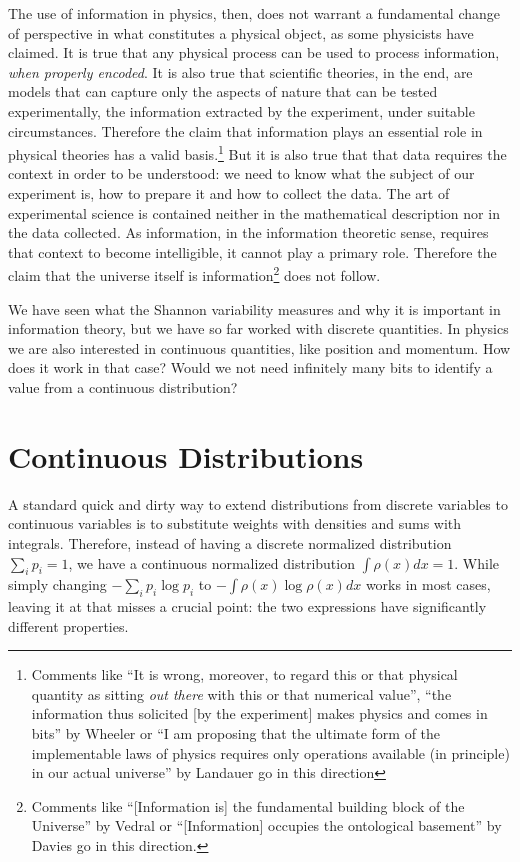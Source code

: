 \documentclass[iopart]{revtex4-1}
\begin{document}
The use of information in physics, then, does not warrant a fundamental change of perspective in what constitutes a physical object, as some physicists have claimed. It is true that any physical process can be used to process information, \emph{when properly encoded}. It is also true that scientific theories, in the end, are models that can capture only the aspects of nature that can be tested experimentally, the information extracted by the experiment, under suitable circumstances. Therefore the claim that information plays an essential role in physical theories has a valid basis.\footnote{Comments like ``It is wrong, moreover, to regard this or that  physical quantity as sitting \emph{out there} with this or that numerical value'', ``the information thus solicited [by the experiment] makes physics and comes in bits'' by Wheeler\cite{Wheeler} or ``I am proposing that the ultimate form of the implementable laws of physics requires only operations available (in principle) in our actual universe'' by Landauer\cite{Landauer} go in this direction} But it is also true that that data requires the context in order to be understood: we need to know what the subject of our experiment is, how to prepare it and how to collect the data. The art of experimental science is contained neither in the mathematical description nor in the data collected. As information, in the information theoretic sense, requires that context to become intelligible, it cannot play a primary role. Therefore the claim that the universe itself is information\footnote{Comments like ``[Information is] the fundamental building block of the Universe'' by Vedral\cite{Vedral} or ``[Information] occupies the ontological basement'' by Davies\cite{Davies} go in this direction.} does not follow.

We have seen what the Shannon variability measures and why it is important in information theory, but we have so far worked with discrete quantities. In physics we are also interested in continuous quantities, like position and momentum. How does it work in that case? Would we not need infinitely many bits to identify a value from a continuous distribution?

\section{Continuous Distributions}\label{sec_cont}

A standard quick and dirty way to extend distributions from discrete variables to continuous variables is to substitute weights with densities and sums with integrals. Therefore, instead of having a discrete normalized distribution $\sum_i p_i = 1$, we have a continuous normalized distribution $\int \rho(x)dx=1$. While simply changing $- \sum_i p_i \log p_i$ to $- \int \rho(x) \log \rho(x) dx$ works in most cases, leaving it at that misses a crucial point: the two expressions have significantly different properties.
\end{document}
